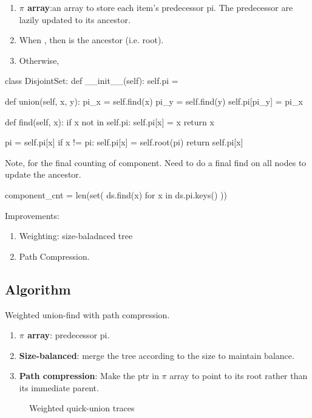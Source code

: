 \begin{enumerate}
\item \textbf{$\pi$ array}:an array to store each item's predecessor pi. The predecessor are lazily updated to its ancestor. 
\item When , then  is the ancestor (i.e. root).
\item Otherwise, 
\end{enumerate}
\begin{python}
class DisjointSet:
    def __init__(self):
        self.pi = {}

    def union(self, x, y):
        pi_x = self.find(x)
        pi_y = self.find(y)
        self.pi[pi_y] = pi_x

    def find(self, x):
        if x not in self.pi:
          self.pi[x] = x
          return x
        
        pi = self.pi[x]
        if x != pi:
          self.pi[x] = self.root(pi)
        return self.pi[x]
\end{python}

Note, for the final counting of component. Need to do a final find on all nodes to
update the ancestor.
\begin{python}
component_cnt = len(set(
    ds.find(x)
    for x in ds.pi.keys()
))
\end{python}

Improvements:
\begin{enumerate}
\item Weighting: size-baladnced tree
\item Path Compression.
\end{enumerate}
\subsection{Algorithm}
Weighted union-find with path compression.\\
\begin{enumerate}
\item \textbf{$\pi$ array}: predecessor pi.
\item \textbf{Size-balanced}: merge the tree according to the size to maintain balance.
\item \textbf{Path compression}: Make the ptr in $\pi$ array to point to its root rather than its immediate parent.
\end{enumerate}
\begin{figure}[]
\centering
\subfloat{\texttt{[image: uf]}}
\caption{Weighted quick-union traces}
\label{fig:union_find}
\end{figure}


